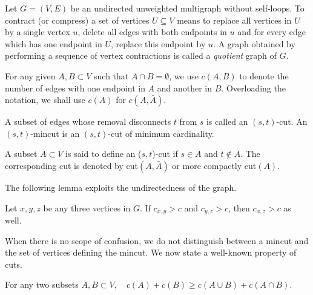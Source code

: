 
Let $G=(V,E)$ be an undirected unweighted multigraph without self-loops. To contract (or compress) a set of vertices $U\subseteq V$ means to replace all vertices in $U$ by a single vertex $u$, delete all edges with both endpoints in $u$ and for every edge which has one endpoint in $U$, replace this endpoint by $u$. A graph obtained by performing a sequence of vertex contractions is called a {\em quotient} graph of $G$.


For any given $A,B\subset V$ such that $A\cap B=\emptyset$, we use $c(A,B)$ to denote the number of edges with one endpoint in $A$
and another in $B$. Overloading the notation, we shall use $c(A)$ for $c(A,\bar{A})$.

\begin{definition}[$(s,t)$-cut]
A subset of edges whose removal disconnects $t$ from $s$ is called an $(s,t)$-cut. An $(s,t)$-mincut is an $(s,t)$-cut of minimum cardinality. 
\label{def:(u,v)-cut}
\end{definition}

\begin{definition}
A subset $A\subset V$ is said to define an ($s,t$)-cut if $s\in A$ and $t\notin A$. The corresponding cut is denoted by cut$(A,\bar{A})$ or more compactly cut$(A)$.  
\label{def:set-definiting-a-cut}
\end{definition}

The following lemma exploits the undirectedness of the graph.
\begin{lemma}
Let $x,y,z$ be any three vertices in $G$. If $c_{x,y}>c$ and $c_{y,z}>c$, then $c_{x,z}>c$ as well. 
\label{lem:triangle-inequality}
\end{lemma}

When there is no scope of confusion, we do not distinguish between a mincut and the set of vertices defining the mincut. 
We now state a well-known property of cuts.
\begin{lemma}
For any two subsets $A,B\subset V$, ~
$ c(A) +c(B) \ge c(A\cup B) + c(A\cap B)$.
\label{lem:submodularity}
\end{lemma}


